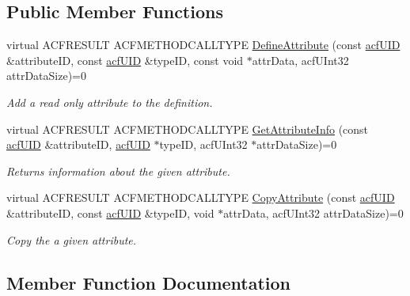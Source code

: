 \subsection*{Public Member Functions}
\begin{DoxyCompactItemize}
\item 
virtual A\+C\+F\+R\+E\+S\+U\+LT A\+C\+F\+M\+E\+T\+H\+O\+D\+C\+A\+L\+L\+T\+Y\+PE \mbox{\hyperlink{a01413_abf9f28b14b95f0835857a9096d108989}{Define\+Attribute}} (const \mbox{\hyperlink{a00269_ab19414382287ff80930c48a196145214}{acf\+U\+ID}} \&attribute\+ID, const \mbox{\hyperlink{a00269_ab19414382287ff80930c48a196145214}{acf\+U\+ID}} \&type\+ID, const void $\ast$attr\+Data, acf\+U\+Int32 attr\+Data\+Size)=0
\begin{DoxyCompactList}\small\item\em Add a read only attribute to the definition. \end{DoxyCompactList}\item 
virtual A\+C\+F\+R\+E\+S\+U\+LT A\+C\+F\+M\+E\+T\+H\+O\+D\+C\+A\+L\+L\+T\+Y\+PE \mbox{\hyperlink{a01413_a067fc04f95d5b558634f8df3bc266815}{Get\+Attribute\+Info}} (const \mbox{\hyperlink{a00269_ab19414382287ff80930c48a196145214}{acf\+U\+ID}} \&attribute\+ID, \mbox{\hyperlink{a00269_ab19414382287ff80930c48a196145214}{acf\+U\+ID}} $\ast$type\+ID, acf\+U\+Int32 $\ast$attr\+Data\+Size)=0
\begin{DoxyCompactList}\small\item\em Returns information about the given attribute. \end{DoxyCompactList}\item 
virtual A\+C\+F\+R\+E\+S\+U\+LT A\+C\+F\+M\+E\+T\+H\+O\+D\+C\+A\+L\+L\+T\+Y\+PE \mbox{\hyperlink{a01413_a8dd0017a8c9bfd837d8938e09995c6bb}{Copy\+Attribute}} (const \mbox{\hyperlink{a00269_ab19414382287ff80930c48a196145214}{acf\+U\+ID}} \&attribute\+ID, const \mbox{\hyperlink{a00269_ab19414382287ff80930c48a196145214}{acf\+U\+ID}} \&type\+ID, void $\ast$attr\+Data, acf\+U\+Int32 attr\+Data\+Size)=0
\begin{DoxyCompactList}\small\item\em Copy the a given attribute. \end{DoxyCompactList}\end{DoxyCompactItemize}


\subsection{Member Function Documentation}
\mbox{\label{a01413_abf9f28b14b95f0835857a9096d108989}} 
